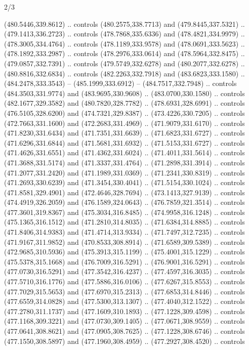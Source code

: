\begin{flagdescription}{2/3}
\begin{scope}[xshift=0.5\flaglength,yshift=0.5\flagwidth,scale=\flagwidth/495.65]
\begin{scope}[y=0.8pt, x=0.8pt, yscale=-1,shift={(-463.76,-309.78)}]
  (480.5446,339.8612) .. controls (480.2575,338.7713) and (479.8445,337.5321) ..
  (479.1413,336.2723) .. controls (478.7868,335.6336) and (478.4821,334.9979) ..
  (478.3005,334.4764) .. controls (478.1189,333.9578) and (478.0691,333.5623) ..
  (478.1892,333.2987) .. controls (478.2976,333.0614) and (478.5964,332.8475) ..
  (479.0857,332.7391) .. controls (479.5749,332.6278) and (480.2077,332.6278) ..
  (480.8816,332.6834) .. controls (482.2263,332.7918) and (483.6823,333.1580) ..
  (484.2478,333.3543) -- (485.1999,333.6912) -- (484.7517,332.7948) .. controls
  (484.3503,331.9774) and (483.9695,330.9608) .. (483.0700,330.1580) .. controls
  (482.1677,329.3582) and (480.7820,328.7782) .. (478.6931,328.6991) .. controls
  (476.5105,328.6200) and (474.7321,329.8387) .. (473.4226,330.7205) .. controls
  (472.7663,331.1600) and (472.2683,331.4969) .. (471.9079,331.6170) .. controls
  (471.8230,331.6434) and (471.7351,331.6639) .. (471.6823,331.6727) .. controls
  (471.6296,331.6844) and (471.5681,331.6932) .. (471.5153,331.6727) .. controls
  (471.4626,331.6551) and (471.4362,331.6024) .. (471.4011,331.5614) .. controls
  (471.3688,331.5174) and (471.3337,331.4764) .. (471.2898,331.3914) .. controls
  (471.2077,331.2420) and (471.1989,331.0369) .. (471.2341,330.8319) .. controls
  (471.2693,330.6239) and (471.3454,330.4041) .. (471.5154,330.1024) .. controls
  (471.8581,329.4901) and (472.4646,328.7694) .. (473.1413,327.9139) .. controls
  (474.4919,326.2059) and (476.1589,324.0643) .. (476.7859,321.3514) .. controls
  (477.3601,319.8367) and (475.3034,316.8485) .. (474.9958,316.1248) .. controls
  (475.1365,316.1512) and (471.2810,314.8035) .. (471.6384,314.8885) .. controls
  (471.8406,314.9383) and (471.4714,313.9334) .. (471.7497,312.7235) .. controls
  (471.9167,311.9852) and (470.8533,308.8914) .. (471.6589,309.5389) .. controls
  (472.9685,310.5936) and (475.3913,315.1199) .. (475.4001,315.1229) .. controls
  (475.5378,315.1668) and (476.7009,316.5291) .. (476.9001,316.5291) .. controls
  (477.0730,316.5291) and (477.3542,316.4237) .. (477.4597,316.3035) .. controls
  (477.5710,316.1776) and (477.5886,316.0106) .. (477.6267,315.8553) .. controls
  (477.7029,315.5653) and (477.6970,315.2313) .. (477.6853,314.8446) .. controls
  (477.6559,314.0828) and (477.5300,313.1307) .. (477.4040,312.1522) .. controls
  (477.2780,311.1737) and (477.1609,310.1893) .. (477.1228,309.4598) .. controls
  (477.1168,309.3221) and (477.0730,309.1405) .. (477.0671,308.9559) .. controls
  (477.0641,308.8621) and (477.0905,308.7625) .. (477.1228,308.6746) .. controls
  (477.1550,308.5897) and (477.1960,308.4959) .. (477.2927,308.4520) .. controls

\end{scope}
\end{scope}
\end{flagdescription}
